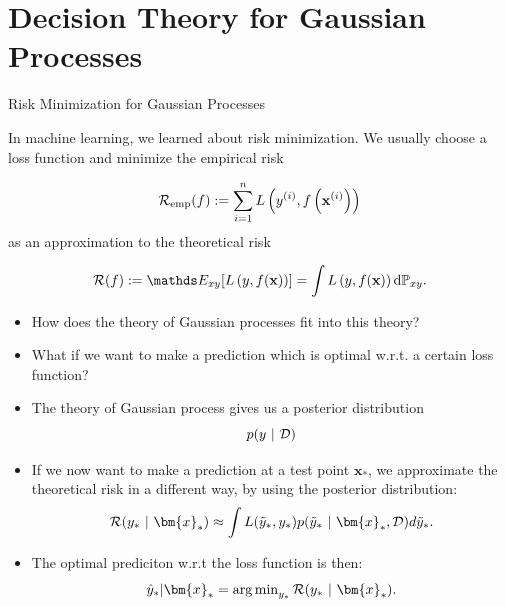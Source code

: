 \documentclass[11pt,compress,t,notes=noshow, xcolor=table]{beamer}
\begin{document}
\section{Decision Theory for Gaussian Processes}

\begin{vbframe}{Risk Minimization for Gaussian Processes}

In machine learning, we learned about risk minimization. We usually choose a loss function and minimize the empirical risk  

$$
  \mathcal{R}_{\text{emp}}(f) := \sum\limits_{i=1}^n L\left(y^{(i)}, f\left(\mathbf{x}^{(i)}\right)\right)
$$
as an approximation to the theoretical risk

$$ 
  \riskf := \E_{xy} [\Lxy] = \int \Lxy \text{d}\Pxy. 
$$

\begin{itemize}
  \item How does the theory of Gaussian processes fit into this theory? 
  \item What if we want to make a prediction which is optimal w.r.t. a certain loss function? 
\end{itemize}

\framebreak 

\begin{itemize}
  \item The theory of Gaussian process gives us a posterior distribution 
  $$
    p(y ~|~\mathcal{D})
  $$
  \item If we now want to make a prediction at a test point $\bm{x}_*$, we approximate the theoretical risk in a different way, by using the posterior distribution: 
  $$
    \mathcal{R}(y_* ~|~ \bm{x}_*) \approx \int L(\tilde y_*, y_*) p(\tilde y_*~|~\bm{x}_*, \D)d\tilde y_*. 
  $$
  \item The optimal prediciton w.r.t the loss function is then: 
  $$
    \hat y_* | \bm{x}_* = \argmin_{y_*} \mathcal{R}(y_*~|~ \bm{x}_*).
  $$
\end{itemize}









\end{vbframe}
\end{document}

